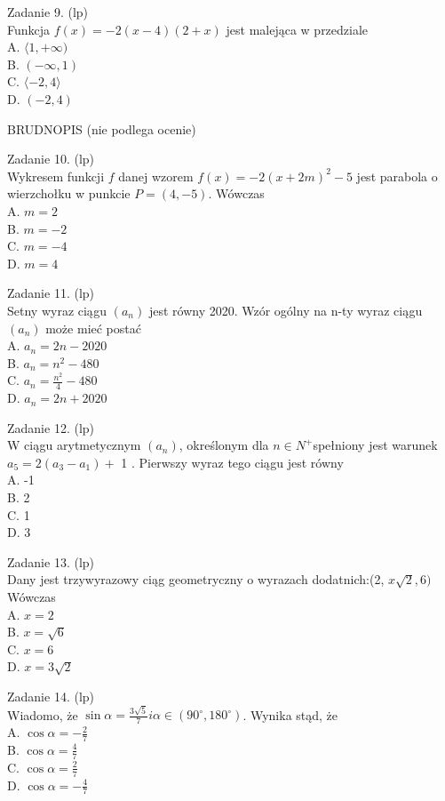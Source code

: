 \documentclass[10pt]{article}
\begin{document}
Zadanie 9. (lp)\\
Funkcja \(f(x)=-2(x-4)(2+x)\) jest malejąca w przedziale\\
A. \(\langle 1,+\infty)\)\\
B. \((-\infty, 1)\)\\
C. \(\langle-2,4\rangle\)\\
D. \((-2,4)\)

BRUDNOPIS (nie podlega ocenie)

Zadanie 10. (lp)\\
Wykresem funkcji \(f\) danej wzorem \(f(x)=-2(x+2 m)^{2}-5\) jest parabola o wierzchołku w punkcie \(P=(4,-5)\). Wówczas\\
A. \(m=2\)\\
B. \(m=-2\)\\
C. \(m=-4\)\\
D. \(m=4\)

Zadanie 11. (lp)\\
Setny wyraz ciągu \(\left(a_{n}\right)\) jest równy 2020. Wzór ogólny na n-ty wyraz ciągu \(\left(a_{n}\right)\) może mieć postać\\
A. \(a_{n}=2 n-2020\)\\
B. \(a_{n}=n^{2}-480\)\\
C. \(a_{n}=\frac{n^{2}}{4}-480\)\\
D. \(a_{n}=2 n+2020\)

Zadanie 12. (lp)\\
W ciągu arytmetycznym \(\left(a_{n}\right)\), określonym dla \(n \in N^{+}\)spełniony jest warunek \(a_{5}=2\left(a_{3}-a_{1}\right)+\) 1 . Pierwszy wyraz tego ciągu jest równy\\
A. -1\\
B. 2\\
C. 1\\
D. 3

Zadanie 13. (lp)\\
Dany jest trzywyrazowy ciąg geometryczny o wyrazach dodatnich:(2, \(x \sqrt{2}, 6)\) Wówczas\\
A. \(x=2\)\\
B. \(x=\sqrt{6}\)\\
C. \(x=6\)\\
D. \(x=3 \sqrt{2}\)

Zadanie 14. (lp)\\
Wiadomo, że \(\sin \alpha=\frac{3 \sqrt{5}}{7} i \alpha \in\left(90^{\circ}, 180^{\circ}\right)\). Wynika stąd, że\\
A. \(\cos \alpha=-\frac{2}{7}\)\\
B. \(\cos \alpha=\frac{4}{7}\)\\
C. \(\cos \alpha=\frac{2}{7}\)\\
D. \(\cos \alpha=-\frac{4}{7}\)
\end{document}
